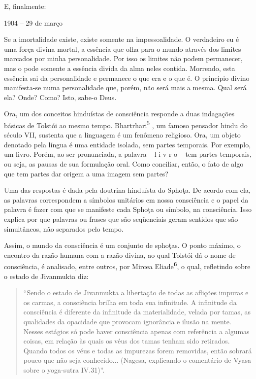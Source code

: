 E, finalmente:

1904 -- 29 de março

Se a imortalidade existe, existe somente na impessoalidade. O verdadeiro
eu é uma força divina mortal, a essência que olha para o mundo através
dos limites marcados por minha personalidade. Por isso os limites não
podem permanecer, mas o pode somente a essência divida da alma neles
contida. Morrendo, esta essência sai da personalidade e permanece o que
era e o que é. O princípio divino manifesta-se numa personalidade que,
porém, não será mais a mesma. Qual será ela? Onde? Como? Isto, sabe-o
Deus.

Ora, um dos conceitos hinduístas de consciência responde a duas
indagações básicas de Tolstói ao mesmo tempo.
Bhartrhari\textsuperscript{5} , um famoso pensador hindu do século VII,
sustenta que a linguagem é um fenômeno religioso. Ora, um objeto
denotado pela língua é uma entidade isolada, sem partes temporais. Por
exemplo, um livro. Porém, ao ser pronunciada, a palavra -- l i v r o --
tem partes temporais, ou seja, as pausas de sua formulação oral. Como
conciliar, então, o fato de algo que tem partes dar origem a uma imagem
sem partes?

Uma das respostas é dada pela doutrina hinduísta do Sphoţa. De acordo
com ela, as palavras correspondem a símbolos unitários em nossa
consciência e o papel da palavra é fazer com que se manifeste cada
Sphoţa ou símbolo, na consciência. Isso explica por que palavras ou
frases que são seqüenciais geram sentidos que são simultâneos, não
separados pelo tempo.

Assim, o mundo da consciência é um conjunto de sphoţas. O ponto máximo,
o encontro da razão humana com a razão divina, ao qual Tolstói dá o nome
de consciência, é analisado, entre outros, por Mircea
Eliade\textbf{\textsuperscript{6}}, o qual, refletindo sobre o estado de
Jivanmukta diz:

\begin{quote}
``Sendo o estado de Jivanmukta a libertação de todas as aflições impuras
e os carmas, a consciência brilha em toda sua infinitude. A infinitude
da consciência é diferente da infinitude da materialidade, velada por
tamas, as qualidades da opacidade que provocam ignorância e ilusão na
mente. Nesses estágios só pode haver consciência apenas com referência a
algumas coisas, em relação às quais os véus dos tamas tenham sido
retirados. Quando todos os véus e todas as impurezas forem removidas,
então sobrará pouco que não seja conhecido... (Nagesa, explicando o
comentário de Vyasa sobre o yoga-sutra IV.31)''.
\end{quote}


